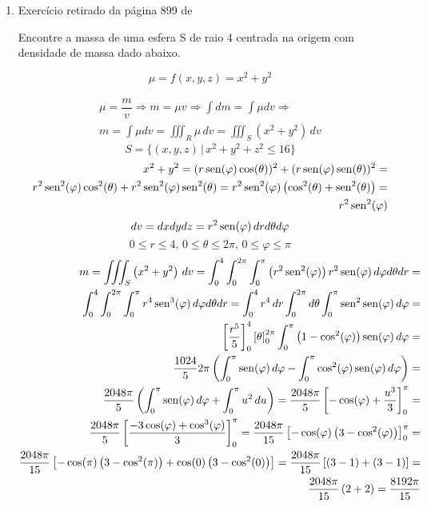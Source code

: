 \begin{enumerate}
	\item Exercício retirado da página 899 de \cite{Jon_Rogawski_calculo_v2}
	
	Encontre a massa de uma esfera S de raio 4 centrada na origem com densidade de massa dado abaixo.
	
	\begin{equation*}
		\mu = f(x,y,z) = x^2 + y^2
	\end{equation*}
	
	\begin{align*}
		\mu = \dfrac{m}{v} \Rightarrow m = \mu v \Rightarrow \int dm = \int \mu dv \Rightarrow\\ m = \int \mu dv = \iiint_R \mu\, dv = \iiint_S \left(x^2 + y^2\right)\, dv
	\end{align*}
	\begin{equation*}
		S = \{(x,y,z) \,|\, x^2 + y^2 + z^2 \leq 16\}
	\end{equation*}
	\begin{align*}
		x^2 + y^2 = (r\operatorname{sen}(\varphi)\cos(\theta))^2 + (r\operatorname{sen}(\varphi)\operatorname{sen}(\theta))^2 =\\ r^2\operatorname{sen}^2(\varphi)\cos^2(\theta) + r^2\operatorname{sen}^2(\varphi)\operatorname{sen}^2(\theta) = r^2\operatorname{sen}^2(\varphi)\left(\cos^2(\theta) + \operatorname{sen}^2(\theta)\right) =\\ r^2\operatorname{sen}^2(\varphi)
	\end{align*}
	\begin{equation*}
		dv = dxdydz = r^2\operatorname{sen}(\varphi)\, dr d\theta d\varphi
	\end{equation*}
	\begin{equation*}
		0 \leq r \leq 4,\, 0 \leq \theta \leq 2\pi,\, 0 \leq \varphi \leq \pi
	\end{equation*}
	\begin{align*}
		m = \iiint_S \left(x^2 + y^2\right)\, dv = \int_0^4 \int_0^{2\pi} \int_0^{\pi} \left(r^2\sen^2(\varphi)\right)r^2\sen(\varphi)\, d\varphi d\theta dr =\\ \int_0^4 \int_0^{2\pi} \int_0^{\pi} r^4\sen^3(\varphi)\, d\varphi d\theta dr = \int_0^4 r^4\,dr \int_0^{2\pi} d\theta \int_0^{\pi} \sen^2\sen(\varphi)\, d\varphi =\\ \left[\dfrac{r^5}{5}\right]_0^4 \left[\theta\right]_0^{2\pi} \int_0^{\pi} \left(1 - \cos^2(\varphi)\right)\sen(\varphi)\, d\varphi =\\ \dfrac{1024}{5}2\pi \left(\int_0^{\pi} \sen(\varphi)\, d\varphi - \int_0^{\pi} \cos^2(\varphi)\sen(\varphi)\, d\varphi\right) =\\ \dfrac{2048\pi}{5} \left(\int_0^{\pi} \sen(\varphi)\, d\varphi + \int_0^{\pi} u^2\, du\right) = \dfrac{2048\pi}{5} \left[- \cos(\varphi)+ \dfrac{u^3}{3}\right]_0^{\pi} =\\ \dfrac{2048\pi}{5} \left[\dfrac{- 3\cos(\varphi) + \cos^3(\varphi)}{3}\right]_0^{\pi} = \dfrac{2048\pi}{15} \left[-\cos(\varphi)\left(3 - \cos^2(\varphi)\right)\right]_0^{\pi} =\\ \dfrac{2048\pi}{15} \left[-\cos(\pi)\left(3 - \cos^2(\pi)\right) + \cos(0)\left(3 - \cos^2(0)\right)\right] = \dfrac{2048\pi}{15} \left[\left(3 - 1\right) + \left(3 - 1\right)\right] =\\ \dfrac{2048\pi}{15} \left(2 + 2\right) = \dfrac{8192\pi}{15}

\end{align*}
\end{enumerate}
